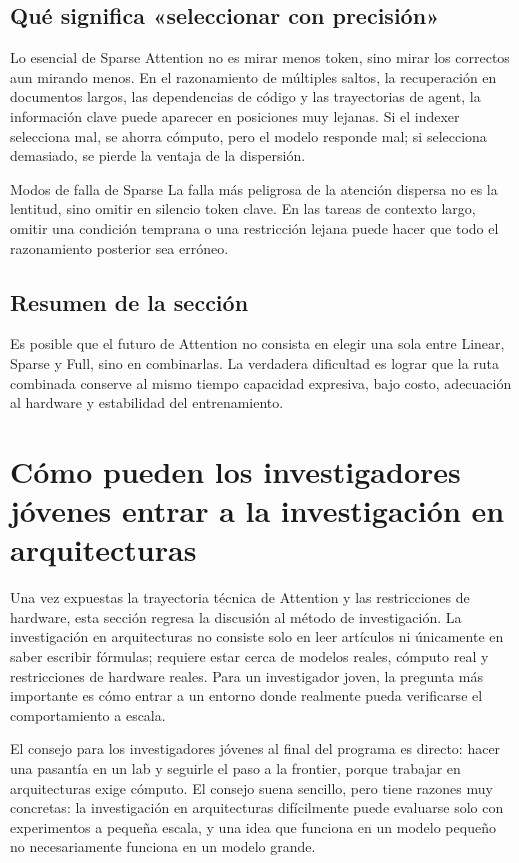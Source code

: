 \documentclass[a4paper]{article}
\begin{document}
\subsection{Qué significa «seleccionar con precisión»}

Lo esencial de Sparse Attention no es mirar menos token, sino mirar los correctos aun mirando menos. En el razonamiento de múltiples saltos, la recuperación en documentos largos, las dependencias de código y las trayectorias de agent, la información clave puede aparecer en posiciones muy lejanas. Si el indexer selecciona mal, se ahorra cómputo, pero el modelo responde mal; si selecciona demasiado, se pierde la ventaja de la dispersión.

\begin{warningbox}{Modos de falla de Sparse}
La falla más peligrosa de la atención dispersa no es la lentitud, sino omitir en silencio token clave. En las tareas de contexto largo, omitir una condición temprana o una restricción lejana puede hacer que todo el razonamiento posterior sea erróneo.
\end{warningbox}

\subsection{Resumen de la sección}

Es posible que el futuro de Attention no consista en elegir una sola entre Linear, Sparse y Full, sino en combinarlas. La verdadera dificultad es lograr que la ruta combinada conserve al mismo tiempo capacidad expresiva, bajo costo, adecuación al hardware y estabilidad del entrenamiento.
\section{Cómo pueden los investigadores jóvenes entrar a la investigación en arquitecturas}

Una vez expuestas la trayectoria técnica de Attention y las restricciones de hardware, esta sección regresa la discusión al método de investigación. La investigación en arquitecturas no consiste solo en leer artículos ni únicamente en saber escribir fórmulas; requiere estar cerca de modelos reales, cómputo real y restricciones de hardware reales. Para un investigador joven, la pregunta más importante es cómo entrar a un entorno donde realmente pueda verificarse el comportamiento a escala.

El consejo para los investigadores jóvenes al final del programa es directo: hacer una pasantía en un lab y seguirle el paso a la frontier, porque trabajar en arquitecturas exige cómputo. El consejo suena sencillo, pero tiene razones muy concretas: la investigación en arquitecturas difícilmente puede evaluarse solo con experimentos a pequeña escala, y una idea que funciona en un modelo pequeño no necesariamente funciona en un modelo grande.
\end{document}
